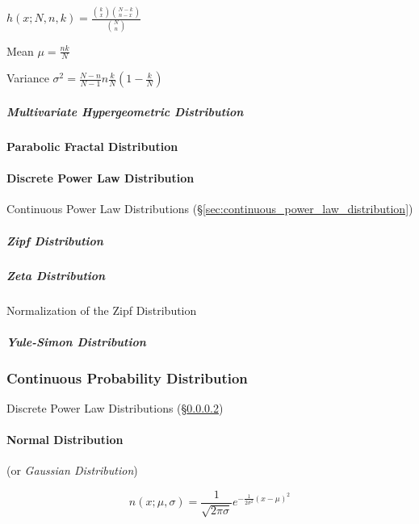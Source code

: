 $h(x; N, n, k) = \frac{\binom{k}{x} \binom{N-k}{n-x}}{\binom{N}{n}}$

Mean $\mu = \frac{nk}{N}$

Variance $\sigma^2 = \frac{N-n}{N-1} n \frac{k}{N}(1 - \frac{k}{N})$



\subparagraph{Multivariate Hypergeometric Distribution}\hfill
\label{sec:multivariate_hypergeometric}



\paragraph{Parabolic Fractal Distribution}
\label{sec:parabolic_fractal_distribution}\hfill

\paragraph{Discrete Power Law Distribution}
\label{sec:discrete_power_law_distribution}\hfill

\fist Continuous Power Law Distributions
(\S\ref{sec:continuous_power_law_distribution})



\subparagraph{Zipf Distribution}\label{sec:zipf_distribution}\hfill

\subparagraph{Zeta Distribution}\label{sec:zeta_distribution}\hfill

Normalization of the Zipf Distribution

\subparagraph{Yule-Simon Distribution}
\label{sec:yule_simon_distribution}\hfill



\subsubsection{Continuous Probability Distribution}
\label{sec:continuous_probability}

\fist Discrete Power Law Distributions
(\S\ref{sec:discrete_power_law_distribution})



\paragraph{Normal Distribution}\label{sec:normal_distribution}\hfill

(or \emph{Gaussian Distribution})

\[
  n (x; \mu, \sigma) =
  \frac{1}{\sqrt{2\pi \sigma}} e^{-\frac{1}{2 \sigma^2}(x - \mu)^2}
\]

